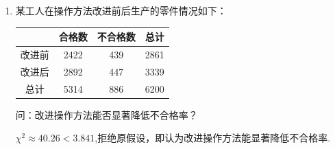 \begin{enumerate}
\item 某工人在操作方法改进前后生产的零件情况如下：
\begin{center}
\begin{tabular}{|c|c|c|c|}
\hline
 & 合格数 & 不合格数 & 总计 \\
\hline
改进前 & 2422 & 439 & 2861 \\
\hline
改进后 & 2892 & 447 & 3339 \\
\hline
总计 & 5314 & 886 & 6200 \\
\hline
\end{tabular}
\end{center}
问：改进操作方法能否显著降低不合格率？
\begin{jieda}
    $\chi^2\approx 40.26< 3.841$,拒绝原假设，即认为改进操作方法能显著降低不合格率.
\end{jieda}



\end{enumerate}
